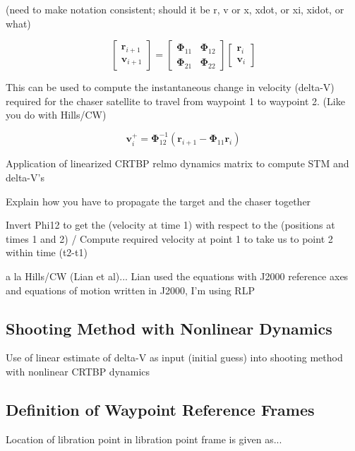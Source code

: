 \documentclass[]{article}
\begin{document}
(need to make notation consistent; should it be r, v or x, xdot, or xi, xidot, or what)

\begin{equation}
\begin{bmatrix}
		\mathbf{r}_{i+1} \\
		\mathbf{v}_{i+1}
		\end{bmatrix}
= 
\begin{bmatrix}
		\boldsymbol{\Phi}_{11} & \boldsymbol{\Phi}_{12} \\
		\boldsymbol{\Phi}_{21} & \boldsymbol{\Phi}_{22}
		\end{bmatrix}
\begin{bmatrix}
		\mathbf{r}_i\\
		\mathbf{v}_i
		\end{bmatrix}
\end{equation}

This can be used to compute the instantaneous change in velocity (delta-V) required for the chaser satellite to travel from waypoint 1 to waypoint 2.  (Like you do with Hills/CW)

\begin{equation}
\mathbf{v}_i^+ = \boldsymbol{\Phi}_{12}^{-1}(\mathbf{r}_{i+1} - \boldsymbol{\Phi}_{11}\mathbf{r}_i)
\end{equation}

Application of linearized CRTBP relmo dynamics matrix to compute STM and delta-V’s

Explain how you have to propagate the target and the chaser together 

Invert Phi12 to get the (velocity at time 1) with respect to the (positions at times 1 and 2) / Compute required velocity at point 1 to take us to point 2 within time (t2-t1)

a la Hills/CW (Lian et al)...  Lian used the equations with J2000 reference axes and equations of motion written in J2000, I'm using RLP

\subsection{Shooting Method with Nonlinear Dynamics}
Use of linear estimate of delta-V as input (initial guess) into shooting method with nonlinear CRTBP dynamics

\subsection{Definition of Waypoint Reference Frames}
Location of libration point in libration point frame is given as...
\end{document}
